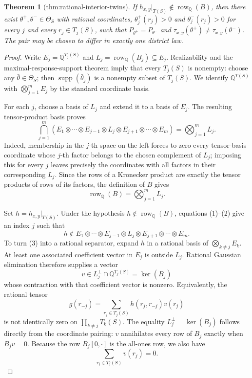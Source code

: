 \documentclass{article}
\newtheorem{theorem}{Theorem}
\begin{document}
\begin{theorem}[thm:rational-interior-twins]\label{thm:rational-interior-twins}
If \(h_{x,y}|_{T(S)}\notin\operatorname{row}_{\mathbb Q}(B)\), then there exist \(\theta^+,\theta^-\in\Theta_S\) with rational coordinates, \(\theta_j^+(r_j)>0\) and \(\theta_j^-(r_j)>0\) for every \(j\) and every \(r_j\in T_j(S)\), such that \(P_{\theta^+}=P_{\theta^-}\) and \(\tau_{x,y}(\theta^+)\ne\tau_{x,y}(\theta^-)\). The pair may be chosen to differ in exactly one district law.
\end{theorem}
\begin{proof}
Write \(E_j=\mathbb Q^{T_j(S)}\) and \(L_j=\operatorname{row}_{\mathbb Q}(B_j)\subseteq E_j\).  Realizability and the maximal-response-support theorem imply that every \(T_j(S)\) is nonempty: choose any \(\bar\theta\in\Theta_S\); then \(\operatorname{supp}(\bar\theta_j)\) is a nonempty subset of \(T_j(S)\).  We identify \(\mathbb Q^{T(S)}\) with \(\bigotimes_{j=1}^m E_j\) by the standard coordinate basis.

For each \(j\), choose a basis of \(L_j\) and extend it to a basis of \(E_j\).  The resulting tensor-product basis proves
\[
\bigcap_{j=1}^m
\left(E_1\otimes\cdots\otimes E_{j-1}\otimes L_j
\otimes E_{j+1}\otimes\cdots\otimes E_m\right)
=\bigotimes_{j=1}^m L_j.                                      \tag{1}
\]
Indeed, membership in the \(j\)-th space on the left forces to zero every tensor-basis coordinate whose \(j\)-th factor belongs to the chosen complement of \(L_j\); imposing this for every \(j\) leaves precisely the coordinates with all factors in their corresponding \(L_j\).  Since the rows of a Kronecker product are exactly the tensor products of rows of its factors, the definition of \(B\) gives
\[
\operatorname{row}_{\mathbb Q}(B)=\bigotimes_{j=1}^mL_j.     \tag{2}
\]

Set \(h=h_{x,y}|_{T(S)}\).  Under the hypothesis \(h\notin\operatorname{row}_{\mathbb Q}(B)\), equations (1)--(2) give an index \(j\) such that
\[
h\notin E_1\otimes\cdots\otimes E_{j-1}\otimes L_j
\otimes E_{j+1}\otimes\cdots\otimes E_m.                    \tag{3}
\]
To turn (3) into a rational separator, expand \(h\) in a rational basis of \(\bigotimes_{k\ne j}E_k\).  At least one associated coefficient vector in \(E_j\) is outside \(L_j\).  Rational Gaussian elimination therefore supplies a vector
\[
v\in L_j^\perp\cap\mathbb Q^{T_j(S)}=\ker(B_j)
\]
whose contraction with that coefficient vector is nonzero.  Equivalently, the rational tensor
\[
g(r_{-j})=
\sum_{r_j\in T_j(S)}h(r_j,r_{-j})v(r_j)                       \tag{4}
\]
is not identically zero on \(\prod_{k\ne j}T_k(S)\).  The equality \(L_j^\perp=\ker(B_j)\) follows directly from the coordinate pairing: \(v\) annihilates every row of \(B_j\) exactly when \(B_jv=0\).  Because the row \(B_j[0,\cdot]\) is the all-ones row, we also have
\[
\sum_{r_j\in T_j(S)}v(r_j)=0.                                \tag{5}
\]


\end{proof}
\end{document}
